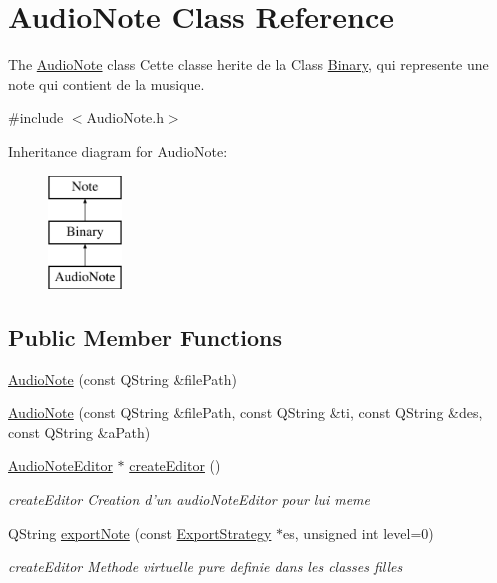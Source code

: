 \hypertarget{class_audio_note}{\section{Audio\-Note Class Reference}
\label{class_audio_note}
}


The \hyperlink{class_audio_note}{Audio\-Note} class Cette classe herite de la Class \hyperlink{class_binary}{Binary}, qui represente une note qui contient de la musique.  




{\ttfamily \#include $<$Audio\-Note.\-h$>$}

Inheritance diagram for Audio\-Note\-:\begin{figure}[H]
\begin{center}
\leavevmode
\includegraphics[height=3.000000cm]{class_audio_note}
\end{center}
\end{figure}
\subsection*{Public Member Functions}
\begin{DoxyCompactItemize}
\item 
\hyperlink{class_audio_note_aeb940f8bc193ca47ffb17fa7555d6821}{Audio\-Note} (const Q\-String \&file\-Path)
\item 
\hyperlink{class_audio_note_ae571e3b6f7fdc688a1c65e4ea4e7141c}{Audio\-Note} (const Q\-String \&file\-Path, const Q\-String \&ti, const Q\-String \&des, const Q\-String \&a\-Path)
\item 
\hyperlink{class_audio_note_editor}{Audio\-Note\-Editor} $\ast$ \hyperlink{class_audio_note_a925cd568ca8d630bd943ad4182ef6ca8}{create\-Editor} ()
\begin{DoxyCompactList}\small\item\em create\-Editor Creation d'un audio\-Note\-Editor pour lui meme \end{DoxyCompactList}\item 
Q\-String \hyperlink{class_audio_note_ad69445a8975ae93d9889bb021f18f8e1}{export\-Note} (const \hyperlink{class_export_strategy}{Export\-Strategy} $\ast$es, unsigned int level=0)
\begin{DoxyCompactList}\small\item\em create\-Editor Methode virtuelle pure definie dans les classes filles \end{DoxyCompactList}\end{DoxyCompactItemize}
